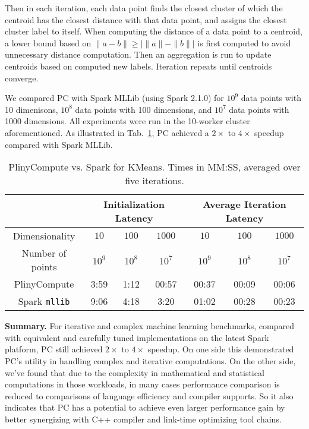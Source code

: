 Then in each iteration, each data point finds the closest cluster
of which the centroid has the closest distance with that data point, and assigns the closest
cluster label to itself. When computing the distance of a data point to a
centroid, a lower bound based on $\|a - b\| \geq |\|a\| - \|b\||$ is
first computed to avoid unnecessary distance computation. Then an aggregation is run to update centroids
based on computed new labels. Iteration repeats until centroids
converge.


We compared PC with Spark MLLib (using Spark 2.1.0) for $10^9$ data
points with 10 dimenisons, $10^8$ data points with 100 dimensions,  and $10^7$
data points with 1000
dimensions. All experiments were run in the 10-worker cluster aforementioned. 
As illustrated in Tab.~\ref{fig:KMeans}, PC achieved a $2\times$ to
$4\times$ speedup compared with Spark MLLib. 

\begin{table}[h!]
\begin{center}
\begin{tabular}{|c||c|c|c||c|c|c||}
\hline
& \multicolumn{3}{c||}{Initialization Latency} & \multicolumn{3}{c||}{Average
                                         Iteration Latency} \\
\hline
Dimensionality & $10$ & $100$ & $1000$ & $10$ & $100$ & $1000$\\
Number of points & $10^9$ & $10^8$ & $10^7$ & $10^9$ & $10^8$ & $10^7$\\
\hline
PlinyCompute &3:59 & 1:12 & 00:57 &00:37 & 00:09 & 00:06\\
Spark \texttt{mllib} &9:06  &4:18 &3:20 &01:02 & 00:28 & 00:23\\
\hline
\end{tabular}
\caption{PlinyCompute vs. Spark for KMeans. Times in MM:SS, averaged over five iterations.}
\label{fig:KMeans}
\end{center}
\end{table}


\vspace{5pt}
\noindent
\textbf{Summary.} For iterative and complex machine learning
benchmarks, compared with equivalent and carefully tuned implementations on the latest
Spark platform, PC still achieved $2 \times$ to $4 \times$
speedup. On one side this demonstrated PC's utility in handling
complex and iterative computations. On the other side, we've found that due to the complexity in mathematical and statistical
computations in those workloads, in many cases performance comparison is reduced to comparisons of
language efficiency and compiler supports. So it also indicates that PC has a
potential to achieve even larger performance gain by better
synergizing with C++ compiler and link-time optimizing tool chains.







